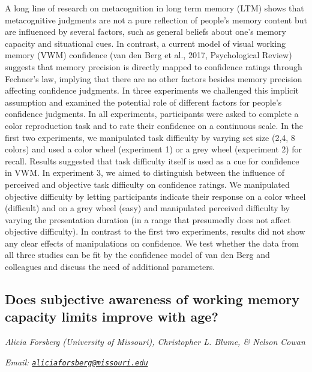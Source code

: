 \documentclass[
  12pt,
]{book}
\begin{document}
A long line of research on metacognition in long term memory (LTM) shows that metacognitive judgments are not a pure reflection of people's memory content but are influenced by several factors, such as general beliefs about one's memory capacity and situational cues. In contrast, a current model of visual working memory (VWM) confidence (van den Berg et al., 2017, Psychological Review) suggests that memory precision is directly mapped to confidence ratings through Fechner's law, implying that there are no other factors besides memory precision affecting confidence judgments. In three experiments we challenged this implicit assumption and examined the potential role of different factors for people's confidence judgments. In all experiments, participants were asked to complete a color reproduction task and to rate their confidence on a continuous scale. In the first two experiments, we manipulated task difficulty by varying set size (2,4, 8 colors) and used a color wheel (experiment 1) or a grey wheel (experiment 2) for recall. Results suggested that task difficulty itself is used as a cue for confidence in VWM. In experiment 3, we aimed to distinguish between the influence of perceived and objective task difficulty on confidence ratings. We manipulated objective difficulty by letting participants indicate their response on a color wheel (difficult) and on a grey wheel (easy) and manipulated perceived difficulty by varying the presentation duration (in a range that presumedly does not affect objective difficulty). In contrast to the first two experiments, results did not show any clear effects of manipulations on confidence. We test whether the data from all three studies can be fit by the confidence model of van den Berg and colleagues and discuss the need of additional parameters.

\hypertarget{does-subjective-awareness-of-working-memory-capacity-limits-improve-with-age}{%
\subsection{Does subjective awareness of working memory capacity limits improve with age?}\label{does-subjective-awareness-of-working-memory-capacity-limits-improve-with-age}}

\emph{Alicia Forsberg (University of Missouri), Christopher L. Blume, \& Nelson Cowan}

\emph{Email: \href{mailto:aliciaforsberg@missouri.edu}{\nolinkurl{aliciaforsberg@missouri.edu}}}
\end{document}
